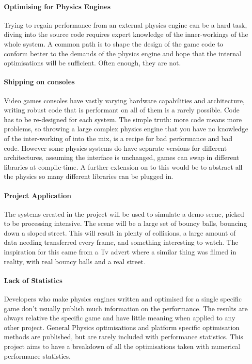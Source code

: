 \documentclass[conference]{acmsiggraph}
\begin{document}
\paragraph{Optimising for Physics Engines}
Trying to regain performance from an external physics engine can be a hard task, diving into the source code requires expert knowledge of the inner-workings of the whole system. A common path is to shape the design of the game code to conform better to the demands of the physics engine and hope that the internal optimisations  will be sufficient. Often enough, they are not.

\paragraph{Shipping on consoles}
Video games consoles have vastly varying hardware capabilities and architecture, writing robust code that is performant on all of them is a rarely possible. Code has to be re-designed for each system. The simple truth: more code means more problems, so throwing a large complex physics engine that you have no knowledge of the inter-working of into the mix, is a recipe for bad performance and bad code. However some physics systems do have separate versions for different architectures, assuming the interface is unchanged, games can swap in different libraries at compile-time. A further extension on to this would be to abstract all the physics so many different libraries can be plugged in.



\paragraph{Project Application}
The systems created in the project will be used to simulate a demo scene, picked to be processing intensive. The scene will be a large set of bouncy balls, bouncing down a sloped street. This will result in plenty of collisions, a large amount of data needing transferred every frame, and something interesting to watch. The inspiration for this came from a Tv advert \cite{advert} where a similar thing was filmed in reality, with real bouncy balls and a real street.

\paragraph{Lack of Statistics}
Developers who make physics engines written and optimised for a single specific game don't usually publish much information on the performance. The results are always relative the specific game and have little meaning when applied to any other project. General Physics optimisations and platform specific optimisation methods are published, but are rarely included with performance statistics. This project aims to have a breakdown of all the optimisations taken with numerical performance statistics.
\end{document}
